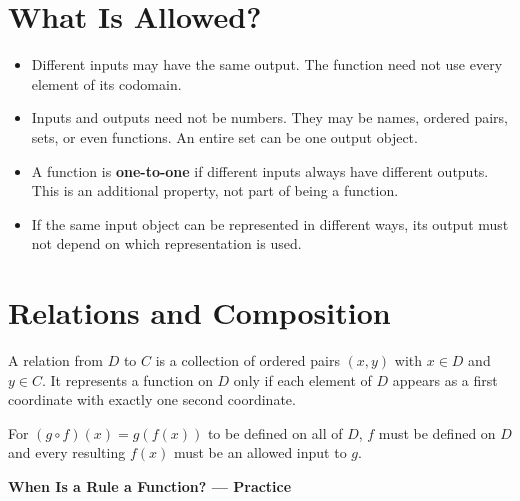 \documentclass[11pt]{article}
\begin{document}
\section*{What Is Allowed?}
\begin{itemize}[leftmargin=*,itemsep=0.3em]
  \item Different inputs may have the same output. The function need not use
  every element of its codomain.
  \item Inputs and outputs need not be numbers. They may be names, ordered
  pairs, sets, or even functions. An entire set can be one output object.
  \item A function is \textbf{one-to-one} if different inputs always have
  different outputs. This is an additional property, not part of being a function.
  \item If the same input object can be represented in different ways,
  its output must not depend on which representation is used.
\end{itemize}

\section*{Relations and Composition}
A relation from $D$ to $C$ is a collection of ordered pairs $(x,y)$ with
$x\in D$ and $y\in C$. It represents a function on $D$ only if each element
of $D$ appears as a first coordinate with exactly one second coordinate.

\medskip
For $(g\circ f)(x)=g(f(x))$ to be defined on all of $D$, $f$ must be defined
on $D$ and every resulting $f(x)$ must be an allowed input to $g$.
\endgroup

\newpage
\begin{center}
  {\large\textbf{When Is a Rule a Function? --- Practice}}
\end{center}
\end{document}
